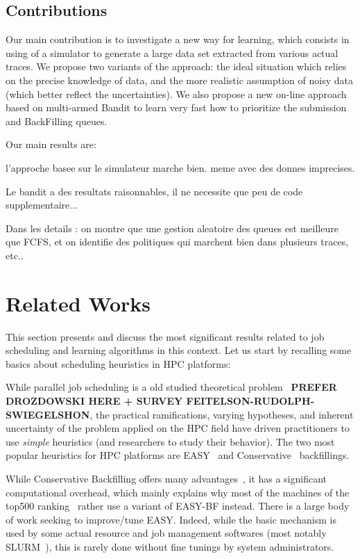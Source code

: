 \documentclass[sigconf]{acmart}
\begin{document}

\subsection{Contributions}

Our main contribution is to investigate a new way for learning, which
consists in using of a simulator to generate a large data set extracted
from various actual traces.
We propose two variants of the approach: the ideal situation which
relies on the  precise knowledge of data, and the more realistic
assumption of noisy data (which better reflect the uncertainties).
We also propose a new on-line approach based on multi-armed Bandit to
learn very fast how to prioritize the submission and BackFilling queues.
\bigskip

Our main results are:

l'approche basee sur le simulateur marche bien. meme avec des donnes
imprecises.

Le bandit a des resultats raisonnables, il ne necessite que peu de code
supplementaire...

Dans les details :
on montre que une gestion aleatoire des queues est meilleure que FCFS,
et on identifie des politiques qui marchent bien dans plusieurs traces,
etc..


\section{Related Works}
\label{sec:rw}

This section presents and discuss the most significant results related
to job scheduling and learning algorithms in this context.
Let us start by recalling some basics about scheduling heuristics in HPC
platforms:

While parallel job scheduling is a old studied theoretical
problem~\cite{leung2004handbook} \textbf{PREFER DROZDOWSKI HERE + SURVEY
FEITELSON-RUDOLPH-SWIEGELSHON}, the practical ramifications, varying
hypotheses, and inherent uncertainty of the problem applied on the HPC
field have driven
practitioners to use \textit{simple} heuristics (and researchers to
study their behavior).
The two most popular heuristics for HPC platforms are EASY~\cite{easy} and
Conservative~\cite{Mu'alem:2001:UPW:380314.380315} backfillings.

While Conservative Backfilling offers many advantages~\cite{bfchar}, it
has a
significant computational overhead, which mainly explains why most of
the machines
of the top500 ranking~\cite{top500} rather use a variant of EASY-BF
instead.
There is a large body of work seeking to improve/tune EASY. Indeed,
while the
basic mechanism is used by some actual resource and job management
softwares (most notably
SLURM~\cite{SLURMdocSCHED}), this is rarely done without fine tunings by
system
administrators.
\end{document}

